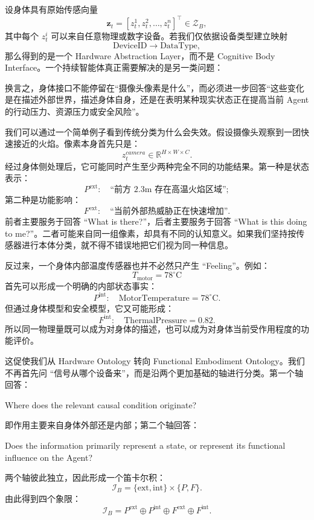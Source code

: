 设身体具有原始传感向量
\[
\mathbf z_t
=
[z_t^1,z_t^2,\ldots,z_t^n]^\top
\in\mathcal Z_B,
\]
其中每个 $z_t^i$ 可以来自任意物理或数字设备。若我们仅依据设备类型建立映射
\[
\mathrm{DeviceID}
\longrightarrow
\mathrm{DataType},
\]
那么得到的是一个 Hardware Abstraction Layer，而不是 Cognitive Body Interface。一个持续智能体真正需要解决的是另一类问题：
\begin{statementbox}
\centering
{}
\end{statementbox}
换言之，身体接口不能停留在``摄像头像素是什么''，而必须进一步回答``这些变化是在描述外部世界，描述身体自身，还是在表明某种现实状态正在提高当前 Agent 的行动压力、资源压力或安全风险''。

我们可以通过一个简单例子看到传统分类为什么会失效。假设摄像头观察到一团快速接近的火焰。像素本身首先只是：
\[
z_t^{camera}\in\mathbb R^{H\times W\times C}.
\]
经过身体侧处理后，它可能同时产生至少两种完全不同的功能结果。第一种是状态表示：
\[
P^{\mathrm{ext}}
:
\quad
\text{``前方 $2.3$m 存在高温火焰区域''};
\]
第二种是功能影响：
\[
F^{\mathrm{ext}}
:
\quad
\text{``当前外部热威胁正在快速增加''}.
\]
前者主要服务于回答 ``What is there?''，后者主要服务于回答 ``What is this doing to me?''。二者可能来自同一组像素，却具有不同的认知意义。如果我们坚持按传感器进行本体分类，就不得不错误地把它们视为同一种信息。

反过来，一个身体内部温度传感器也并不必然只产生 ``Feeling''。例如：
\[
T_{\mathrm{motor}}=78^\circ \mathrm C
\]
首先可以形成一个明确的内部状态事实：
\[
P^{\mathrm{int}}
:
\quad
\text{MotorTemperature}=78^\circ \mathrm C.
\]
但通过身体模型和安全模型，它又可能形成：
\[
F^{\mathrm{int}}
:
\quad
\mathrm{ThermalPressure}=0.82.
\]
所以同一物理量既可以成为对身体的描述，也可以成为对身体当前受作用程度的功能评价。

这促使我们从 Hardware Ontology 转向 Functional Embodiment Ontology。我们不再首先问 ``信号从哪个设备来''，而是沿两个更加基础的轴进行分类。第一个轴回答：
\begin{statementbox}
Where does the relevant causal condition originate?
\end{statementbox}
即作用主要来自身体外部还是内部；第二个轴回答：
\begin{statementbox}
Does the information primarily represent a state,
or represent its functional influence on the Agent?
\end{statementbox}
两个轴彼此独立，因此形成一个笛卡尔积：
\[
\mathcal I_B
=
\{\mathrm{ext},\mathrm{int}\}
\times
\{P,F\}.
\]
由此得到四个象限：
\[
\boxed{
\mathcal I_B
=
P^{\mathrm{ext}}
\oplus
P^{\mathrm{int}}
\oplus
F^{\mathrm{ext}}
\oplus
F^{\mathrm{int}}.
}
\]

